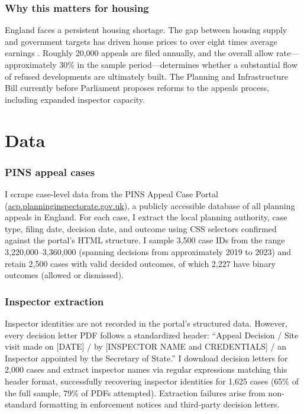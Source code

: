 \documentclass[12pt]{article}
\begin{document}
\subsubsection*{Why this matters for housing} England faces a persistent housing shortage. The gap between housing supply and government targets has driven house prices to over eight times average earnings \citep{hilber2016government}. Roughly 20,000 appeals are filed annually, and the overall allow rate---approximately 30\% in the sample period---determines whether a substantial flow of refused developments are ultimately built. The Planning and Infrastructure Bill currently before Parliament proposes reforms to the appeals process, including expanded inspector capacity.

\section{Data}
\label{sec:data}

\subsubsection*{PINS appeal cases} I scrape case-level data from the PINS Appeal Case Portal (\url{acp.planninginspectorate.gov.uk}), a publicly accessible database of all planning appeals in England. For each case, I extract the local planning authority, case type, filing date, decision date, and outcome using CSS selectors confirmed against the portal's HTML structure. I sample 3,500 case IDs from the range 3,220,000--3,360,000 (spanning decisions from approximately 2019 to 2023) and retain 2,500 cases with valid decided outcomes, of which 2,227 have binary outcomes (allowed or dismissed).

\subsubsection*{Inspector extraction} Inspector identities are not recorded in the portal's structured data. However, every decision letter PDF follows a standardized header: ``Appeal Decision / Site visit made on [DATE] / by [INSPECTOR NAME and CREDENTIALS] / an Inspector appointed by the Secretary of State.'' I download decision letters for 2,000 cases and extract inspector names via regular expressions matching this header format, successfully recovering inspector identities for 1,625 cases (65\% of the full sample, 79\% of PDFs attempted). Extraction failures arise from non-standard formatting in enforcement notices and third-party decision letters.
\end{document}
